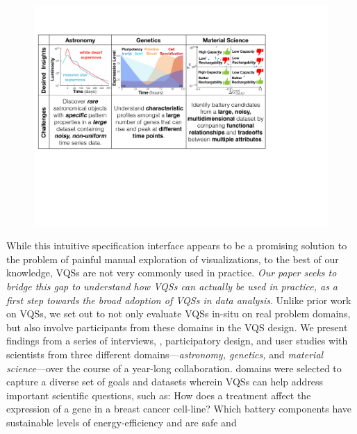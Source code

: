 \vspace{-5pt}
\begin{figure}[ht!]
	\centering
	\includegraphics[width=\linewidth]{figures/science_goal.pdf}
	\caption{}
	\label{science_goal}
	\vspace*{-15pt}
\end{figure}
\par While this intuitive specification interface appears to be a promising solution
to the problem of painful manual exploration of visualizations,
to the best of our knowledge, VQSs are not very commonly used in practice.
{\em Our paper seeks to bridge this gap
to understand how VQSs can actually be used in practice,
as a first step towards the broad adoption of VQSs in data analysis}.
Unlike prior work on VQSs,
we set out to not only evaluate VQSs in-situ on
real problem domains, but also involve participants
from these domains in the VQS design.
We present findings from a series of interviews,
, participatory design,
and user studies with scientists from three different domains---{\em astronomy, genetics,} and {\em material science}---over the course of
a year-long collaboration.  domains were selected to capture
a diverse set of goals
and datasets wherein VQSs can help address
important scientific questions, such as:
How does a treatment affect the expression
of a gene in a breast cancer cell-line?
Which battery components have sustainable
levels of energy-efficiency and are safe and
